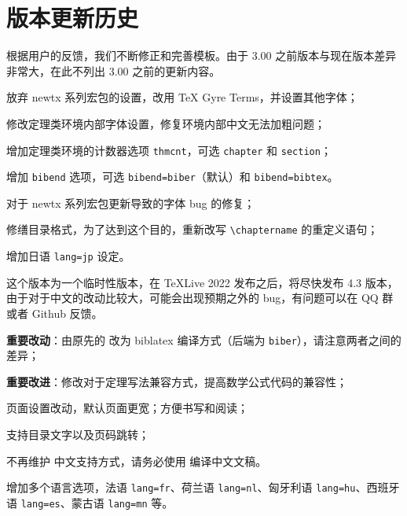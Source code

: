 \documentclass[lang=cn,10pt]{elegantbook}
\begin{document}
\chapter{版本更新历史}

根据用户的反馈，我们不断修正和完善模板。由于 3.00 之前版本与现在版本差异非常大，在此不列出 3.00 之前的更新内容。



\begin{change}
  \item 放弃 newtx 系列宏包的设置，改用 TeX Gyre Terms，并设置其他字体；
  \item 修改定理类环境内部字体设置，修复环境内部中文无法加粗问题；
  \item 增加定理类环境的计数器选项 \lstinline{thmcnt}，可选 \lstinline{chapter} 和 \lstinline{section}；
  \item 增加 \lstinline{bibend} 选项，可选 \lstinline{bibend=biber}（默认）和 \lstinline{bibend=bibtex}。
\end{change}




\begin{change}
  \item 对于 newtx 系列宏包更新导致的字体 bug 的修复；
  \item 修缮目录格式，为了达到这个目的，重新改写 \lstinline{\chaptername} 的重定义语句；
  \item 增加日语 \lstinline{lang=jp} 设定。
  \item 这个版本为一个临时性版本，在 \TeX Live 2022 发布之后，将尽快发布 4.3 版本，由于对于中文的改动比较大，可能会出现预期之外的 bug，有问题可以在 QQ 群或者 Github 反馈。
\end{change}



\begin{change}
  \item \textbf{重要改动}：由原先的  改为 biblatex 编译方式（后端为 \lstinline{biber}），请注意两者之间的差异；
  \item \textbf{重要改进}：修改对于定理写法兼容方式，提高数学公式代码的兼容性；
  \item 页面设置改动，默认页面更宽；方便书写和阅读；
  \item 支持目录文字以及页码跳转；
  \item 不再维护  中文支持方式，请务必使用  编译中文文稿。
  \item 增加多个语言选项，法语 \lstinline{lang=fr}、荷兰语 \lstinline{lang=nl}、匈牙利语 \lstinline{lang=hu}、西班牙语 \lstinline{lang=es}、蒙古语 \lstinline{lang=mn} 等。
\end{change}
\end{document}
